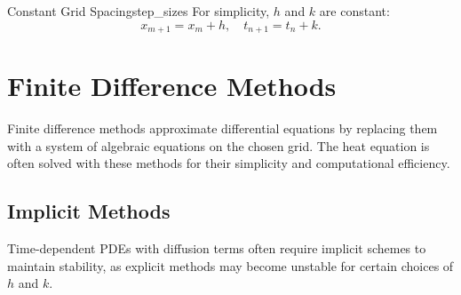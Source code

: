 \begin{remark}{Constant Grid Spacing}{step_sizes}
  For simplicity, $h$ and $k$ are constant:
  \[
    x_{m+1} = x_m + h,\quad t_{n+1} = t_n + k.
  \]
\end{remark}


\section{Finite Difference Methods}

Finite difference methods approximate differential equations by replacing them with a system of algebraic equations on the chosen grid.
The heat equation is often solved with these methods for their simplicity and computational efficiency.

\subsection{Implicit Methods}
Time-dependent PDEs with diffusion terms often require implicit schemes to maintain stability, as explicit methods may become unstable for certain choices of $h$ and $k$.

\begin{lemma}{}{}
\end{lemma}

\clearpage


